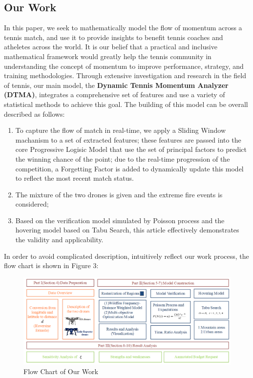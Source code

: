 \documentclass[12pt]{article}  %
\begin{document}
\subsection{Our Work}
In this paper, we seek to mathematically model the flow of momentum across a tennis match, and use it to provide insights to benefit tennis coaches and atheletes across the world. It is our belief that a practical and inclusive mathematical framework would greatly help the tennis community in understanding the concept of momentum to improve performance, strategy, and training methodologies. Through extensive investigation and research in the field of tennis, our main model, the \textbf{Dynamic Tennis Momentum Analyzer (DTMA)}, integrates a comprehensive set of features and use a variety of statistical methods to achieve this goal. The building of this model can be overall described as follows:
\begin{enumerate}[\bfseries (1)]
    \setlength{\parsep}{0ex} %
    \setlength{\topsep}{2ex} %
    \setlength{\itemsep}{1ex} %
    \item To capture the flow of match in real-time, we apply a Sliding Window machanism to a set of extracted features; these features are passed into the core Progressive Logisic Model that use the set of principal factors to predict the winning chance of the point; due to the real-time progression of the competition, a Forgetting Factor is added to dynamically update this model to reflect the most recent match status. 
    \item The mixture of the two drones is given and the extreme fire events is considered;
    \item Based on the verification model simulated by Poisson process and the hovering model based on Tabu Search, this article effectively demonstrates the validity and applicability.
\end{enumerate}
In order to avoid complicated description, intuitively reflect our work process, the flow chart is shown in Figure 3:

\begin{figure}[htbp]  %
\centering  %
\includegraphics[width=.9\textwidth]{Flow_Chart.png} %
\caption{Flow Chart of Our Work} %
\end{figure}
\vspace{-0.8cm}
\end{document}
